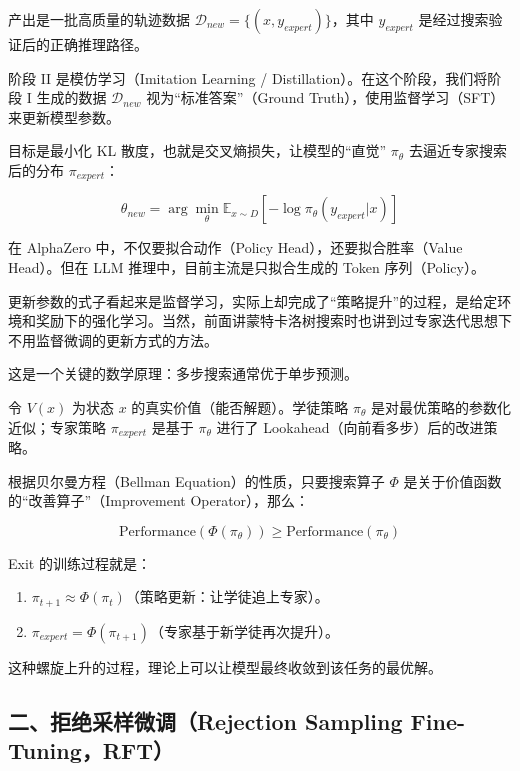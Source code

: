 产出是一批高质量的轨迹数据 \(\mathcal{D}_{new}=\{(x,y_{expert})\}\)，其中 \(y_{expert}\) 是经过搜索验证后的正确推理路径。

阶段 II 是模仿学习（Imitation Learning / Distillation）。在这个阶段，我们将阶段 I 生成的数据 \(\mathcal{D}_{new}\) 视为``标准答案''（Ground Truth），使用监督学习（SFT）来更新模型参数。

目标是最小化 KL 散度，也就是交叉熵损失，让模型的``直觉'' \(\pi_\theta\) 去逼近专家搜索后的分布 \(\pi_{expert}\)：

\[
\theta_{new}=\arg\min_\theta \mathbb{E}_{x\sim D}\left[-\log\pi_\theta(y_{expert}|x)\right]
\]

在 AlphaZero 中，不仅要拟合动作（Policy Head），还要拟合胜率（Value Head）。但在 LLM 推理中，目前主流是只拟合生成的 Token 序列（Policy）。

更新参数的式子看起来是监督学习，实际上却完成了``策略提升''的过程，是给定环境和奖励下的强化学习。当然，前面讲蒙特卡洛树搜索时也讲到过专家迭代思想下不用监督微调的更新方式的方法。

这是一个关键的数学原理：多步搜索通常优于单步预测。

令 \(V(x)\) 为状态 \(x\) 的真实价值（能否解题）。学徒策略 \(\pi_\theta\) 是对最优策略的参数化近似；专家策略 \(\pi_{expert}\) 是基于 \(\pi_\theta\) 进行了 Lookahead（向前看多步）后的改进策略。

根据贝尔曼方程（Bellman Equation）的性质，只要搜索算子 \(\Phi\) 是关于价值函数的``改善算子''（Improvement Operator），那么：

\[
\mathrm{Performance}(\Phi(\pi_\theta))\ge \mathrm{Performance}(\pi_\theta)
\]

Exit 的训练过程就是：

\begin{enumerate}
\def\labelenumi{\arabic{enumi}.}
\tightlist
\item
  \(\pi_{t+1}\approx\Phi(\pi_t)\)（策略更新：让学徒追上专家）。
\item
  \(\pi_{expert}=\Phi(\pi_{t+1})\)（专家基于新学徒再次提升）。
\end{enumerate}

这种螺旋上升的过程，理论上可以让模型最终收敛到该任务的最优解。

\hypertarget{ux4e8cux62d2ux7eddux91c7ux6837ux5faeux8c03rejection-sampling-fine-tuningrft}{%
\subsection{二、拒绝采样微调（Rejection Sampling Fine-Tuning，RFT）}\label{ux4e8cux62d2ux7eddux91c7ux6837ux5faeux8c03rejection-sampling-fine-tuningrft}}

